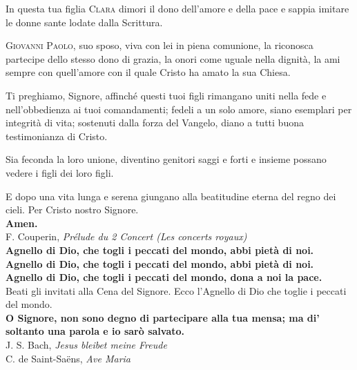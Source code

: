 \documentclass[10pt,b6paper,usenames,twoside]{article}
\begin{document}
\noindent In questa tua figlia \textcolor{forestgreen(traditional)}{\textsc{Clara}} dimori il dono dell'amore e della pace e sappia imitare le donne sante lodate dalla Scrittura. 

\noindent \textcolor{forestgreen(traditional)}{\textsc{Giovanni Paolo}}, suo sposo, viva con lei in piena comunione, la riconosca partecipe dello stesso dono di grazia, la onori come uguale nella dignità, la ami sempre con quell'amore con il quale Cristo ha amato la sua Chiesa.

\noindent Ti preghiamo, Signore, affinché questi tuoi figli rimangano uniti nella fede e nell'obbedienza ai tuoi comandamenti; fedeli a un solo amore, siano esemplari per integrità di vita; sostenuti dalla forza del Vangelo, diano a tutti buona testimonianza di Cristo. 

\noindent Sia feconda la loro unione, diventino genitori saggi e forti e insieme possano vedere i figli dei loro figli. 

\noindent E dopo una vita lunga e serena giungano alla beatitudine eterna del regno dei cieli. Per Cristo nostro Signore.\\
\noindent \textbf{Amen.}\\ 

\noindent \textcolor{forestgreen(traditional)}{\Acht} \hspace*{0mm} F. Couperin, \textit{Prélude du 2 Concert (Les concerts royaux)}\\

\noindent \textbf{Agnello di Dio, che togli i peccati del mondo, abbi pietà di noi.\\ Agnello di Dio, che togli i peccati del mondo, abbi pietà di noi.\\ Agnello di Dio, che togli i peccati del mondo, dona a noi la pace.}\\ 

\noindent Beati gli invitati alla Cena del Signore. Ecco l'Agnello di Dio che toglie i peccati del mondo.\\ 
\noindent \textbf{O Signore, non sono degno di partecipare alla tua mensa; ma di' soltanto una parola e io sarò salvato.}\\ 


\noindent \textcolor{forestgreen(traditional)}{\Acht} \hspace*{0mm} J. S. Bach, \textit{Jesus bleibet meine Freude}\\
\noindent \textcolor{forestgreen(traditional)}{\Acht} \hspace*{0mm} C. de Saint-Sa\"{e}ns, \textit{Ave Maria}
\end{document}
